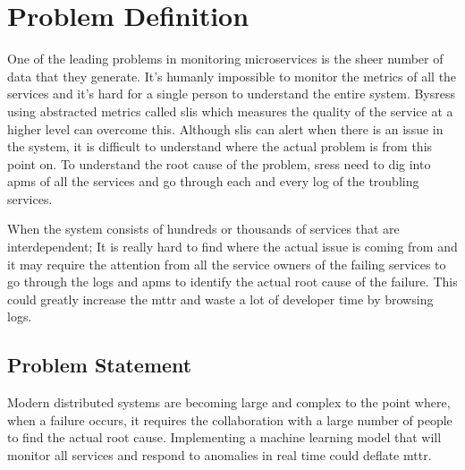 \section{Problem Definition}

One of the leading problems in monitoring microservices is the sheer number of data that they generate. It's humanly impossible to monitor the metrics of all the services and it's hard for a single person to understand the entire system. By\acp{sres} using abstracted metrics called \acp{sli} which measures the quality of the service at a higher level can overcome this. Although \acp{sli} can alert when there is an issue in the system, it is difficult to understand where the actual problem is from this point on. To understand the root cause of the problem, \acp{sres} need to dig into \acp{apm} of all the services and go through each and every log of the troubling services.

When the system consists of hundreds or thousands of services that are interdependent; It is really hard to find where the actual issue is coming from and it may require the attention from all the service owners of the failing services to go through the logs and \acp{apm} to identify the actual root cause of the failure. This could greatly increase the \ac{mttr} and waste a lot of developer time by browsing logs.

\subsection{Problem Statement}

Modern distributed systems are becoming large and complex to the point where, when a failure occurs, it requires the collaboration with a large number of people to find the actual root cause.  Implementing a machine learning model that will monitor all services and respond to anomalies in real time could deflate \ac{mttr}.